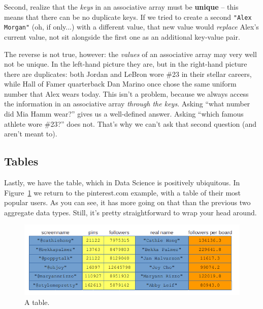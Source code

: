 Second, realize that the \textit{keys} in an associative array must be
\textbf{unique} -- this means that there can be no duplicate keys. If we tried
to create a second \texttt{"Alex Morgan"} (oh, if only...) with a different
value, that new value would \textit{replace} Alex's current value, not sit
alongside the first one as an additional key-value pair.

The reverse is not true, however: the \textit{values} of an associative array
may very well not be unique. In the left-hand picture they are, but in the
right-hand picture there are duplicates: both Jordan and LeBron wore \#23 in
their stellar careers, while Hall of Famer quarterback Dan Marino once chose
the same uniform number that Alex wears today. This isn't a problem, because we
always access the information in an associative array \textit{through the
keys}. Asking ``what number did Mia Hamm wear?'' gives us a well-defined
answer. Asking ``which famous athlete wore \#23?'' does not. That's why we
can't ask that second question (and aren't meant to).

\subsection{Tables}

\label{tables}

Lastly, we have the table, which in Data Science is positively ubiquitous. In
Figure~\ref{fig:table} we return to the pinterest.com example, with a table of
their most popular users. As you can see, it has more going on that than the
previous two aggregate data types. Still, it's pretty straightforward to wrap
your head around.

\begin{figure}[ht]
\centering
\includegraphics[width=\textwidth]{table.png}
\caption{A table.}
\label{fig:table}
\end{figure}

\label{tallAndSkinny}

